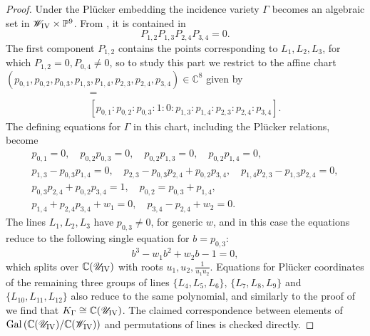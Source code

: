 \documentclass[a4paper,reqno]{amsart}
\numberwithin{equation}{section}
\newcommand{\C}{\mathbb{C}}
\newcommand{\p}{\mathbb{P}}
\numberwithin{equation}{section}
\begin{document}
\begin{proof}
    Under the Pl\"ucker embedding the incidence variety $\Gamma$ becomes an algebraic set in $\mathscr{W}_{\rm{IV}}\times \p^9$.
    From , it is contained in 
    $$ P_{1,2} P_{1,3}P_{2,4}P_{3,4}=0.$$
    The first component $P_{1,2}$ contains the points corresponding to $L_1,L_2,L_3$, for which $P_{1,2}=0, P_{0,4}\neq0$, so to study this part we restrict to the affine chart $(p_{0,1},p_{0,2},p_{0,3},p_{1,3},p_{1,4},p_{2,3},p_{2,4},p_{3,4})\in\C^8$ given by
    \begin{gather*} [P_{0,1}:P_{0,2}:P_{0,3}:P_{0,4}:P_{1,2}:P_{1,3}:P_{1,4}:P_{2,3}:P_{2,4}:P_{3,4}]= \\
    [p_{0,1}:p_{0,2}:p_{0,3}:1:0:p_{1,3}:p_{1,4}:p_{2,3}:p_{2,4}:p_{3,4}].\end{gather*}
    The defining equations for $\Gamma$ in this chart, including the Pl\"ucker relations, become
    \begin{equation*} 
        \begin{gathered}
            p_{0,1}=0, \quad p_{0,2}p_{0,3}=0, \quad
            p_{0,2}p_{1,3}=0, \quad p_{0,2}p_{1,4}=0, \\
            p_{1,3}- p_{0,3}p_{1,4}=0,\quad 
            p_{2,3} - p_{0,3}p_{2,4}+ p_{0,2}p_{3,4},\quad
            p_{1,4}p_{2,3}-p_{1,3}p_{2,4} = 0,\\
            p_{0,3}p_{2,4}+ p_{0,2}p_{3,4}=1,\quad 
            p_{0,2} = p_{0,3}+p_{1,4},\\
            p_{1,4}+p_{2,4}p_{3,4} + w_1=0,\quad p_{3,4}- p_{2,4} + w_2 = 0.
        \end{gathered}
    \end{equation*}
    The lines $L_1,L_2,L_3$ have $p_{0,3}\neq 0$, for generic $w$, and in this case the equations reduce to the following single equation for $b=p_{0,3}$:
    $$b^3 - w_1 b^2 + w_2 b-1=0,$$
    which splits over $\C(\mathscr{U}_{\rm{IV}})$ with roots $u_1,u_2, \tfrac{1}{u_1u_2}$. 
    Equations for Pl\"ucker coordinates of the remaining three groups of lines $\{L_{4},L_5,L_6\}$, $\{L_7,L_8,L_9\}$ and $\{L_{10},L_{11},L_{12}\}$ also reduce to the same polynomial, 
    and similarly to the proof of  we find that $K_{\Gamma}\cong \C(\mathscr{U}_{\rm{IV}})$.
    The claimed correspondence between elements of $\operatorname{Gal}\left(\C(\mathscr{U}_{\rm{IV}})/\C(\mathscr{W}_{\rm{IV}})\right)$ and permutations of lines is checked directly.
\end{proof}

\begingroup
\end{document}
